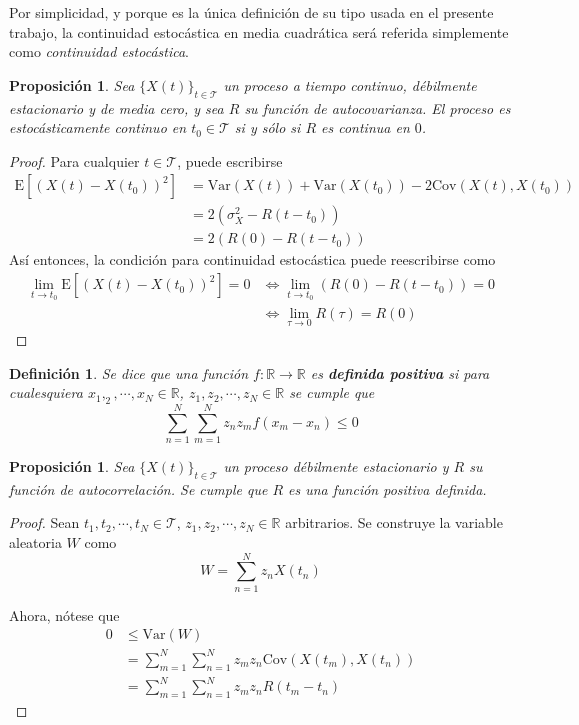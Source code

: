 \documentclass[12pt,letterpaper]{book}
\newtheorem{definicion}{Definición}[chapter]
\newtheorem{proposicion}[teorema]{Proposición}
\newcommand{\R}{\mathbb{R}}
\newcommand{\E}[1]{\mathrm{E}\left[ #1 \right]}
\newcommand{\Var}[1]{\mathrm{Var}\left( #1 \right)}
\newcommand{\Cov}[1]{\mathrm{Cov}\left( #1 \right)}
\newcommand{\xt}{$\{X(t)\}_{t\in \mathcal{T}}$ }
\begin{document}
Por simplicidad, y porque es la única definición de su tipo usada en el presente trabajo, la continuidad estocástica en media cuadrática será referida simplemente como \textit{continuidad estocástica}.

\begin{proposicion}
Sea \xt un proceso a tiempo continuo, débilmente estacionario y de media cero, y sea $R$ su función de autocovarianza. El proceso es estocásticamente continuo en $t_0\in \mathcal{T}$ si y sólo si $R$ es continua en $0$.
\end{proposicion}

\begin{proof}
Para cualquier $t\in \mathcal{T}$, puede escribirse
\begin{align*}
\E{\left( X(t) - X(t_0) \right)^{2}} &= \Var{X(t)} + \Var{X(t_0)} - 2 \Cov{X(t),X(t_0)} \\
&= 2 \left( \sigma_X^{2} - R(t-t_0) \right) \\
&= 2 \left( R(0) - R(t-t_0) \right)
\end{align*}
Así entonces, la condición para continuidad estocástica puede reescribirse como
\begin{align*}
\lim_{t \rightarrow t_0} \E{\left( X(t) - X(t_0) \right)^{2}} = 0 
&\Leftrightarrow
\lim_{t \rightarrow t_0} \left( R(0) - R(t-t_0) \right) = 0 \\
&\Leftrightarrow
\lim_{\tau \rightarrow 0} R(\tau) = R(0)
\end{align*}
\end{proof}

\begin{definicion}
Se dice que una función $f: \R\rightarrow \R$ es \textbf{definida positiva} si para cualesquiera $x_1, _2, \cdots, x_N \in \R$, $z_1, z_2, \cdots, z_N \in \R$ se cumple que 
\begin{equation}
\sum_{n=1}^{N} \sum_{m=1}^{N} z_n z_m f(x_m-x_n) \leq 0
\end{equation}
\end{definicion}

\begin{proposicion}
Sea \xt un proceso débilmente estacionario y $R$ su función de autocorrelación. Se cumple que $R$ es una función positiva definida.
\end{proposicion}

\begin{proof}
Sean $t_1, t_2, \cdots, t_N \in \mathcal{T}$, $z_1, z_2, \cdots, z_N \in \R$ arbitrarios. Se construye la variable aleatoria $W$ como
\begin{equation}
W = \sum_{n=1}^{N} z_n X(t_n)
\end{equation}

Ahora, nótese que
\begin{align*}
0 &\leq \Var{W} \\
&= \sum_{m=1}^{N} \sum_{n=1}^{N} z_m z_n \Cov{X(t_m),X(t_n)} \\
&= \sum_{m=1}^{N} \sum_{n=1}^{N} z_m z_n R(t_m-t_n)
\end{align*}
\end{proof}
\end{document}
